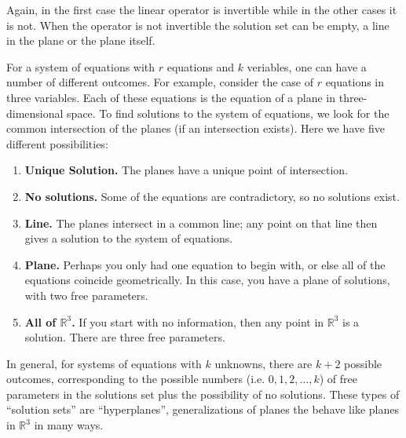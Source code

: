 Again, in the first case the linear operator is invertible while in the other cases it is not. When the operator is not invertible the solution set can be empty, a line in the plane or the plane itself.


For a system of equations with $r$ equations and $k$ veriables, one can have a number of different outcomes.  For example, consider the case of $r$ equations in three variables.  Each of these equations is the equation of a plane in three-dimensional space.  To find solutions to the system of equations, we look for the common intersection of the planes (if an intersection exists).  Here we have five different possibilities:

\begin{enumerate}
\item \textbf{Unique Solution.}  The planes have a unique point of intersection.

\item \textbf{No solutions.}  Some of the equations are contradictory, so no solutions exist.

\item \textbf{Line.}  The planes intersect in a common line; any point on that line then gives a solution to the system of equations.

\item \textbf{Plane.}  Perhaps you only had one equation to begin with, or else all of the equations coincide geometrically.  In this case, you have a plane of solutions, with two free parameters.


\item \textbf{All of $\mathbb{R}^3$.}  If you start with no information, then any point in $\mathbb{R}^3$ is a solution.  There are three free parameters.
\end{enumerate}

In general, for systems of equations with $k$ unknowns, there are $k+2$ possible outcomes, corresponding to the possible numbers (i.e. $0,1,2,\dots,k$) of free parameters in the solutions set plus the possibility of no solutions.  These types of ``solution sets'' are ``hyperplanes'', generalizations of planes the behave like planes in $\mathbb{R}^3$ in many ways.


